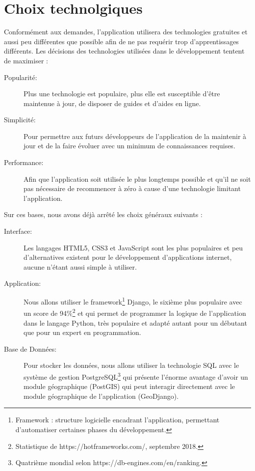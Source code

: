 \documentclass[a4paper, 11pt]{article}
\begin{document}
\section{Choix technolgiques}
  Conformément aux demandes, l'application utilisera des technologies gratuites et aussi peu différentes que possible afin de ne pas requérir trop d'apprentissages différents. Les décisions des technologies utilisées dans le développement tentent de maximiser :
  \begin{description}
    \item[Popularité:] Plus une technologie est populaire, plus elle est susceptible d'être maintenue à jour, de disposer de guides et d'aides en ligne.
    \item[Simplicité:] Pour permettre aux futurs développeurs de l'application de la maintenir à jour et de la faire évoluer avec un minimum de connaissances requises.
    \item[Performance:] Afin que l'application soit utilisée le plus longtemps possible et qu'il ne soit pas nécessaire de recommencer à zéro à cause d'une technologie limitant l'application.
  \end{description}

  Sur ces bases, nous avons déjà arrêté les choix généraux suivants :
  \begin{description}
    \item[Interface:] Les langages HTML5, CSS3 et JavaScript sont les plus populaires et peu d'alternatives existent pour le développement d'applications internet, aucune n'étant aussi simple à utiliser.
    \item[Application:] Nous allons utiliser le framework\footnote{Framework : structure logicielle encadrant l'application, permettant d'automatiser certaines phases du développement.} Django, le sixième plus populaire avec un score de 94\%\footnote{Statistique de https://hotframeworks.com/, septembre 2018.} et qui permet de programmer la logique de l'application dans le langage Python, très populaire et adapté autant pour un débutant que pour un expert en programmation.
    \item[Base de Données:] Pour stocker les données, nous allons utiliser la technologie SQL avec le système de gestion PostgreSQL\footnote{Quatrième mondial selon https://db-engines.com/en/ranking.} qui présente l'énorme avantage d'avoir un module géographique (PostGIS) qui peut interagir directement avec le module géographique de l'application (GeoDjango).
  \end{description}
\end{document}
